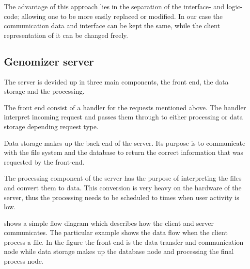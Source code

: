  The advantage of this approach lies in the separation of the interface- and logic-code; allowing one to be more easily replaced or modified. In our case the communication data and interface can be kept the same, while the client representation of it can be changed freely.
 

\subsection{Genomizer server}
The server is devided up in three main components, the front end, the data storage and the processing.

The front end consist of a handler for the  requests mentioned above. The handler interpret incoming request and passes them through to either processing or data storage depending request type.

Data storage makes up the back-end of the server. Its purpose is to communicate with the file system and the database to return the correct information that was requested by the front-end.

The processing component of the server has the purpose of interpreting the  files and convert them to  data. This conversion is very heavy on the hardware of the server, thus the processing needs to be scheduled to times when user activity is low.

 shows a simple flow diagram which describes how the client and server
 communicates. The particular example shows the data flow when the client process a file.
 In the figure the front-end is the data transfer and communication node while data storage makes up the database node and processing the final process node.

